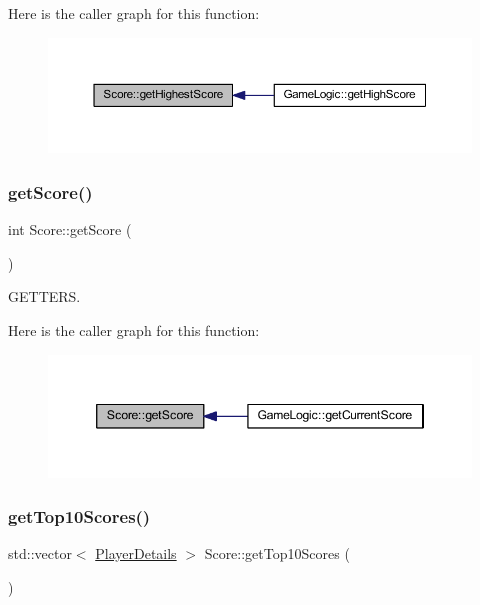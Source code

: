 Here is the caller graph for this function\+:\nopagebreak
\begin{figure}[H]
\begin{center}
\leavevmode
\includegraphics[width=350pt]{class_score_afb50f4e2cb31006d23d3281dd1703880_icgraph}
\end{center}
\end{figure}
\mbox{\label{class_score_a8627c93270c188a3fd28a25b1d07a9e7}} 
\subsubsection{\texorpdfstring{get\+Score()}{getScore()}}
{\footnotesize\ttfamily int Score\+::get\+Score (\begin{DoxyParamCaption}{ }\end{DoxyParamCaption})}



G\+E\+T\+T\+E\+RS. 

Here is the caller graph for this function\+:
\nopagebreak
\begin{figure}[H]
\begin{center}
\leavevmode
\includegraphics[width=346pt]{class_score_a8627c93270c188a3fd28a25b1d07a9e7_icgraph}
\end{center}
\end{figure}
\mbox{\label{class_score_a13094831f08b313321193e212862417b}} 
\subsubsection{\texorpdfstring{get\+Top10\+Scores()}{getTop10Scores()}}
{\footnotesize\ttfamily std\+::vector$<$ \hyperlink{struct_player_details}{Player\+Details} $>$ Score\+::get\+Top10\+Scores (\begin{DoxyParamCaption}{ }\end{DoxyParamCaption})}

